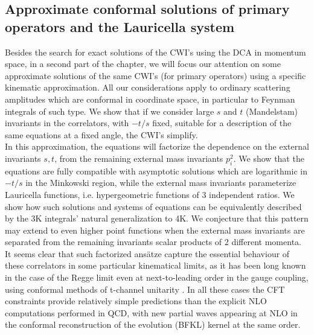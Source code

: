 \documentclass[a4paper,11pt,openright,twoside]{book}
\numberwithin{equation}{section}
\begin{document}
{\subsection{Approximate conformal solutions of primary operators and the Lauricella system}
Besides the search for exact solutions of the CWI's using the DCA in momentum space, in a second part of the chapter, we will focus our attention on some approximate solutions of the same CWI's (for primary operators) using a specific kinematic approximation. All our considerations apply to ordinary scattering amplitudes which are conformal in coordinate space, in particular to Feynman integrals of such type. We show that if we consider large $s$ and $t$ (Mandelstam) invariants in the correlators, with $-t/s$ fixed, suitable for a description of the same equations at a fixed angle, the CWI's simplify.\\
In this approximation, the equations will factorize the dependence on the external invariants $s, t$, from the remaining external mass invariants $p_i^2$. 
We show that the equations are fully compatible with asymptotic solutions which are logarithmic in  $-t/s$ in the Minkowski region, while the external mass invariants parameterize Lauricella functions, i.e. hypergeometric functions of 3 independent ratios. We show how such solutions and systems of equations can be equivalently described by the 3K integrals' natural generalization to 4K. We conjecture that this pattern may extend to even higher point functions when the external mass invariants are separated from the remaining invariants scalar products of 2 different momenta. It seems clear that such factorized ans\"atze capture the essential behaviour of these correlators in some particular kinematical limits, as it has been long known in the case of the Regge limit even at next-to-leading order in the gauge coupling, using conformal methods of t-channel unitarity \cite{Coriano:1995fj,Coriano:1996rj,Coriano:1994wk,Coriano:1995hx}. In all these cases the CFT constraints provide relatively simple predictions than the explicit  NLO computations performed in QCD, with new partial waves appearing at NLO in the conformal reconstruction of the evolution (BFKL) kernel at the same order. 
}
\end{document}
